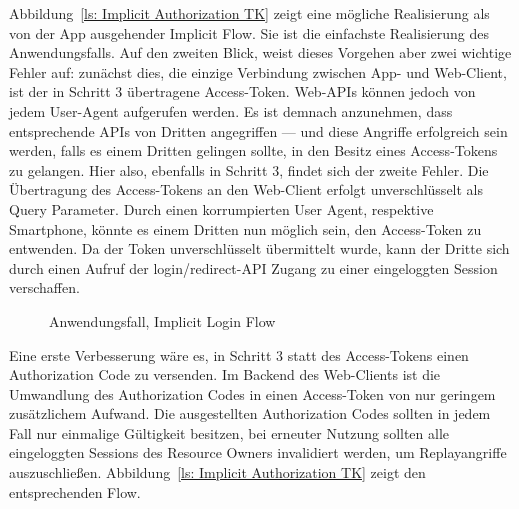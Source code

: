 Abbildung~\ref{ls: Implicit Authorization TK} zeigt eine mögliche Realisierung
als von der App ausgehender Implicit Flow. Sie ist die einfachste Realisierung
des Anwendungsfalls. 
Auf den zweiten Blick, weist dieses Vorgehen aber zwei wichtige Fehler auf:
zunächst dies, die einzige Verbindung zwischen App- und Web-Client, ist der in
Schritt 3 übertragene Access-Token. Web-APIs können jedoch von jedem User-Agent
aufgerufen werden. Es ist demnach anzunehmen, dass entsprechende APIs von
Dritten angegriffen --- und diese Angriffe erfolgreich sein werden, falls es
einem Dritten gelingen sollte, in den Besitz eines Access-Tokens zu gelangen.
Hier also, ebenfalls in Schritt 3, findet sich der zweite Fehler. Die
Übertragung des Access-Tokens an den Web-Client erfolgt unverschlüsselt als
Query Parameter. Durch einen korrumpierten User Agent, respektive Smartphone,
könnte es einem Dritten nun möglich sein, den Access-Token zu entwenden. Da der
Token unverschlüsselt übermittelt wurde, kann der Dritte sich durch einen Aufruf
der login/redirect-API Zugang zu einer eingeloggten Session verschaffen.

\begin{figure}[h]
    \scalebox{.5}{
        
    }
    \caption{Anwendungsfall, Implicit Login Flow}\label{ls: Implicit Authorization
    TK}
\end{figure} \noindent
Eine erste Verbesserung wäre es, in Schritt 3 statt
des Access-Tokens einen Authorization Code zu versenden. Im Backend des
Web-Clients ist die Umwandlung des Authorization Codes in einen Access-Token von
nur geringem zusätzlichem Aufwand. Die ausgestellten Authorization Codes sollten
in jedem Fall nur einmalige Gültigkeit besitzen, bei erneuter Nutzung sollten
alle eingeloggten Sessions des Resource Owners invalidiert werden, um
Replayangriffe auszuschließen. Abbildung~\ref{ls:
Implicit Authorization TK} zeigt den entsprechenden Flow.

